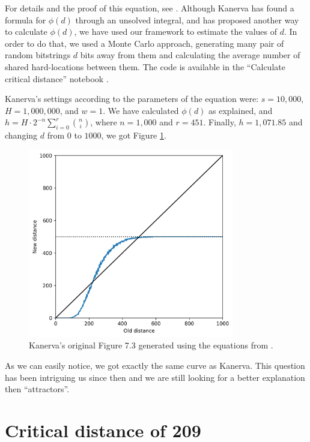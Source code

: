 For details and the proof of this equation, see \citet{brogliato2014sparse}. Although Kanerva has found a formula for $\phi(d)$ through an unsolved integral, and \citet{de1995geometrical} has proposed another way to calculate $\phi(d)$, we have used our framework to estimate the values of $d$. In order to do that, we used a Monte Carlo approach, generating many pair of random bitstrings $d$ bits away from them and calculating the average number of shared hard-locations between them. The code is available in the ``Calculate critical distance'' notebook \citep{sdmframework}.

Kanerva's settings according to the parameters of the equation were: $s=10,000$, $H=1,000,000$, and $w=1$. We have calculated $\phi(d)$ as explained, and $h = H \cdot 2^{-n} \sum_{i=0}^{r} \binom{n}{i}$, where $n=1,000$ and $r=451$. Finally, $h=1,071.85$ and changing $d$ from $0$ to $1000$, we got Figure \ref{fig:kanerva-figure-73-calculated}.

\begin{figure}[!htb]
\centering\includegraphics[width=0.8\textwidth]{./images02/calculated-table-72.png}
\caption{Kanerva's original Figure 7.3 generated using the equations from \citet{brogliato2014sparse}.
\label{fig:kanerva-figure-73-calculated}
}
\end{figure}

As we can easily notice, we got exactly the same curve as Kanerva. This question has been intriguing us since then and we are still looking for a better explanation then ``attractors''.


\section{Critical distance of 209}


